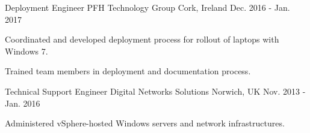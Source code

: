 \begin{cventries}

\cventry
{Deployment Engineer} %
{PFH Technology Group} %
{Cork, Ireland} %
{Dec. 2016 - Jan. 2017} %
{ %
\begin{cvitems}
\item {Coordinated and developed deployment process for rollout of laptops with Windows 7.}
\item {Trained team members in deployment and documentation process.}
\end{cvitems}
}


\cventry
{Technical Support Engineer} %
{Digital Networks Solutions} %
{Norwich, UK} %
{Nov. 2013 - Jan. 2016} %
{ %
\begin{cvitems}
\item {Administered vSphere-hosted Windows servers and network infrastructures.}
\end{cvitems}
}



\end{cventries}
